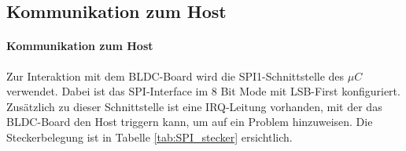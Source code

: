 
\ifSTANDALONE
\subsection{Kommunikation zum Host}
\fi
\ifEMBED
\paragraph{Kommunikation zum Host}$~~$\vspace{2mm}\\
\fi
Zur Interaktion mit dem BLDC-Board wird die SPI1-Schnittstelle des $\mu C$ verwendet. Dabei
ist das SPI-Interface im 8 Bit Mode mit LSB-First konfiguriert. Zusätzlich zu dieser Schnittstelle
ist eine IRQ-Leitung vorhanden, mit der das BLDC-Board den Host triggern kann, um auf ein Problem 
hinzuweisen. Die Steckerbelegung ist in Tabelle \ref{tab:SPI_stecker} ersichtlich.

